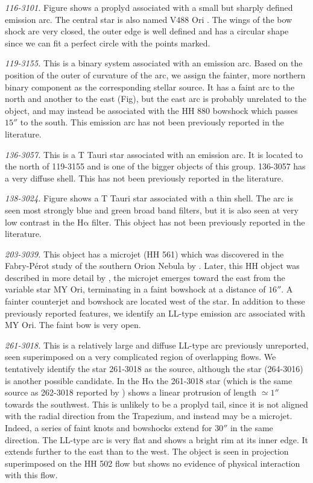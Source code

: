\documentclass[apj, twocolumn]{aastex63}
\newcommand\ha{\ensuremath{\mathrm{H\alpha}}}
\begin{document}
\textit{116-3101.} Figure shows a proplyd associated with a small
but sharply defined emission arc.  The central star is also
named V488 Ori \citep{Bally:2006a}. The wings of the bow shock
are very closed, the outer edge is well defined and has a circular
shape since we can fit a perfect circle with the points marked.  

\textit{119-3155.} This is a binary system associated with an
emission arc. Based on the position of the outer of curvature of
the arc, we assign the fainter, more northern binary component as
the corresponding stellar source. It has a faint arc to the north
and another to the east (Fig), but  the east arc is probably
unrelated to the object, and may instead be associated with the
HH 880 bowshock which passes \(15''\) to the south. This emission
arc has not been previously reported in the literature.     

\textit{136-3057.} This is a T Tauri star associated with an
emission arc. It is located to the north of 119-3155 and is
one of the bigger objects of this group. 136-3057 has a very
diffuse shell. This has not been previously reported in the
literature.

\textit{138-3024.} Figure shows a T Tauri star associated with a
thin shell. The arc is seen most strongly blue and green broad
band filters, but it is also seen at very low contrast in the \ha{}
filter. This object has not been previously reported in the
literature.

\textit{203-3039.} This object has a microjet (HH 561) which was
discovered in the Fabry-Pérot study of the southern Orion Nebula
by \citet{Bally:2001a}. Later, this HH object was described in
more detail by \citet{Bally:2006a}, the microjet emerges toward
the east from the variable star MY Ori, terminating in a faint
bowshock at a distance of \(16''\). A fainter counterjet and
bowshock are located west of the star. In addition to these
previously reported features, we identify an LL-type emission arc
associated with MY Ori. The faint bow is very open.

\textit{261-3018.} This is a relatively large and diffuse LL-type
arc previously unreported, seen superimposed on a very complicated
region of overlapping flows. We tentatively identify the star 261-3018
as the source, although the star (264-3016) is another possible
candidate. In the \ha{} the 261-3018 star (which is the same source
as 262-3018 reported by \citealp{Bally:2006a})  shows a linear protrusion
of length \(\simeq1''\) towards the southwest. This is unlikely to be
a proplyd tail, since it is not aligned with the radial direction from
the Trapezium, and instead may be a microjet. Indeed, a series of faint
knots and bowshocks extend for \(30''\) in the same direction.
The LL-type arc is very flat and shows a bright rim at its inner edge.
It extends further to the east than to the west. The object is seen
in projection superimposed on the HH 502 flow but shows no evidence
of physical interaction with this flow.
\end{document}
